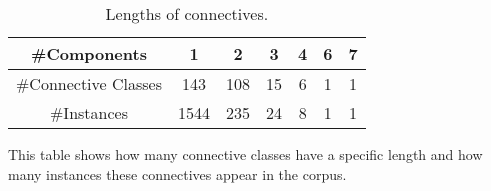 \begin{table}[ht]
\centering
\begin{tabular}{|c|c|c|c|c|c|c|}
\hline
\#Components         & 1    & 2   & 3  & 4 & 6 & 7 \\ \hline
\#Connective Classes & 143  & 108 & 15 & 6 & 1 & 1 \\ \hline
\#Instances          & 1544 & 235 & 24 & 8 & 1 & 1 \\ \hline
\end{tabular}
\caption{\label{t:connective-length} Lengths of connectives.}
This table shows how many connective classes have a specific length
and how many instances these connectives appear in the corpus.
\end{table}

